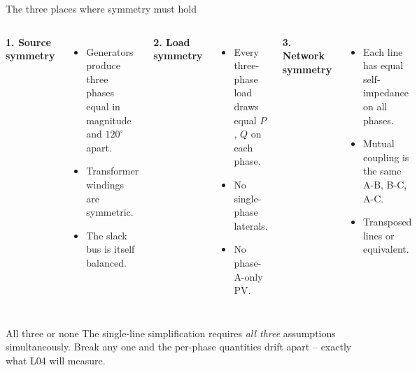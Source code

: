 \documentclass[aspectratio=169,10pt]{beamer}
\begin{document}
\begin{frame}{The three places where symmetry must hold}
\begin{columns}[T]
\textbf{1. Source symmetry}
\begin{itemize}
  \item Generators produce three phases equal in magnitude and $120^\circ$ apart.
  \item Transformer windings are symmetric.
  \item The slack bus is itself balanced.
\end{itemize}
\textbf{2. Load symmetry}
\begin{itemize}
  \item Every three-phase load draws equal $P$, $Q$ on each phase.
  \item No single-phase laterals.
  \item No phase-A-only PV.
\end{itemize}
\textbf{3. Network symmetry}
\begin{itemize}
  \item Each line has equal self-impedance on all phases.
  \item Mutual coupling is the same A-B, B-C, A-C.
  \item Transposed lines or equivalent.
\end{itemize}
\end{columns}
\vspace{0.8em}
\begin{block}{All three or none}
The single-line simplification requires \emph{all three} assumptions simultaneously. Break any one and the per-phase quantities drift apart -- exactly what L04 will measure.
\end{block}
\end{frame}
\end{document}
